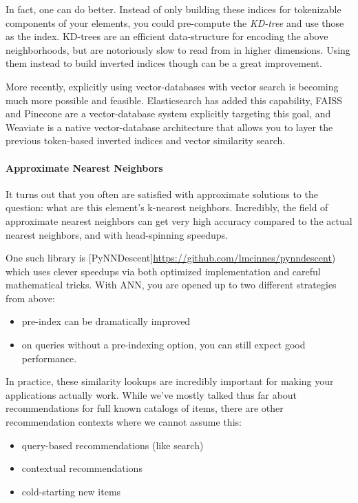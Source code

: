In fact, one can do better. Instead of only building these indices for tokenizable components of your elements, you could pre-compute the \emph{KD-tree} and use those as the index. KD-trees are an efficient data-structure for encoding the above neighborhoods, but are notoriously slow to read from in higher dimensions. Using them instead to build inverted indices though can be a great improvement. 

More recently, explicitly using vector-databases with vector search is becoming much more possible and feasible. Elasticsearch has added this capability, FAISS and Pinecone are a vector-database system explicitly targeting this goal, and Weaviate is a native vector-database architecture that allows you to layer the previous token-based inverted indices and vector similarity search.

\paragraph{Approximate Nearest Neighbors}

It turns out that you often are satisfied with approximate solutions to the question: what are this element's k-nearest neighbors. Incredibly, the field of approximate nearest neighbors can get very high accuracy compared to the actual nearest neighbors, and with head-spinning speedups.

One such library is [PyNNDescent]\url{https://github.com/lmcinnes/pynndescent}) which uses clever speedups via both optimized implementation and careful mathematical tricks. With ANN, you are opened up to two different strategies from above:

\begin{itemize}
\item pre-index can be dramatically improved
\item on queries without a pre-indexing option, you can still expect good performance.
\end{itemize}

In practice, these similarity lookups are incredibly important for making your applications actually work. While we've mostly talked thus far about recommendations for full known catalogs of items, there are other recommendation contexts where we cannot assume this:

\begin{itemize}
\item query-based recommendations (like search)
\item contextual recommendations
\item cold-starting new items
\end{itemize}

